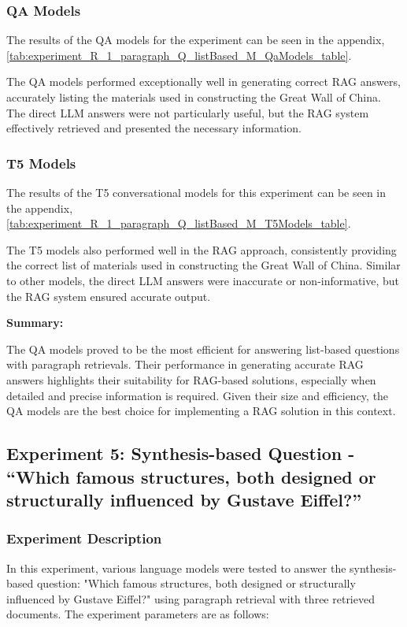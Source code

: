 \documentclass{wseas}
\begin{document}
\subsubsection{QA Models}


The results of the QA models for the experiment
can be seen in the appendix, \autoref{tab:experiment_R_1_paragraph_Q_listBased_M_QaModels_table}.

The QA models performed exceptionally well in generating correct RAG
answers, accurately listing the materials used in constructing the Great
Wall of China. The direct LLM answers were not particularly useful, but
the RAG system effectively retrieved and presented the necessary
information.

\subsubsection{T5 Models}


The results of the T5 conversational models for this experiment can be seen 
in the appendix, \autoref{tab:experiment_R_1_paragraph_Q_listBased_M_T5Models_table}.

The T5 models also performed well in the RAG approach, consistently
providing the correct list of materials used in constructing the Great
Wall of China. Similar to other models, the direct LLM answers were
inaccurate or non-informative, but the RAG system ensured accurate
output.

\textbf{Summary:}

The QA models proved to be the most efficient for answering list-based
questions with paragraph retrievals. Their performance in generating
accurate RAG answers highlights their suitability for RAG-based
solutions, especially when detailed and precise information is required.
Given their size and efficiency, the QA models are the best choice for
implementing a RAG solution in this context.

\subsection{Experiment 5: Synthesis-based Question - ``Which famous
structures, both designed or structurally influenced by Gustave
Eiffel?''}

\subsubsection{Experiment Description}

In this experiment, various language models were tested to answer the
synthesis-based question: "Which famous structures, both designed or
structurally influenced by Gustave Eiffel?" using paragraph retrieval
with three retrieved documents. The experiment parameters are as
follows:
\end{document}
